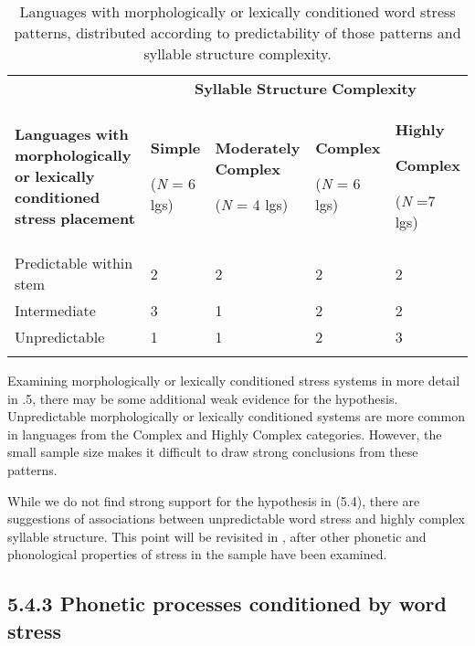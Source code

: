 \begin{table}
\begin{tabularx}{\textwidth}{XXXXX}
\lsptoprule
 & \multicolumn{4}{c}{ \textbf{Syllable} \textbf{Structure} \textbf{Complexity}}\\
 \textbf{Languages} \textbf{with} \textbf{morphologically} \textbf{or} \textbf{lexically} \textbf{conditioned} \textbf{stress} \textbf{placement} & { \textbf{Simple}}

 (\textit{N} = 6 lgs) & { \textbf{Moderately} \textbf{Complex}}

 (\textit{N} = 4 lgs) & { \textbf{Complex}}

 (\textit{N} = 6 lgs) & { \textbf{Highly} }

{ \textbf{Complex}}

 (\textit{N} =7 lgs)\\
 Predictable within stem & 2 & 2 & 2 & 2\\
 Intermediate & 3 & 1 & 2 & 2\\
 Unpredictable & 1 & 1 & 2 & 3\\
\lspbottomrule
\end{tabularx}
\caption{\label{5.5}Languages with morphologically or lexically conditioned word stress patterns, distributed according to predictability of those patterns and syllable structure complexity.}
\end{table}




  Examining morphologically or lexically conditioned stress systems in more detail in .5, there may be some additional weak evidence for the hypothesis. Unpredictable morphologically or lexically conditioned systems are more common in languages from the Complex and Highly Complex categories. However, the small sample size makes it difficult to draw strong conclusions from these patterns.



  While we do not find strong support for the hypothesis in (5.4), there are suggestions of associations between unpredictable word stress and highly complex syllable structure. This point will be revisited in , after other phonetic and phonological properties of stress in the sample have been examined.


\subsection{5.4.3 Phonetic processes conditioned by word stress}

